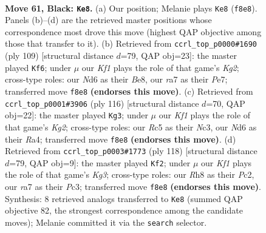 \documentclass[11pt]{article}
\begin{document}
\clearpage

\begin{figure}[p]\centering
\begin{subfigure}{0.46\textwidth}\centering
\resizebox{\linewidth}{!}{%
\newchessgame
\chessboard[
  setfen={5k1r/R6p/P2n4/2r5/2B5/1Pp3KP/R1P3P1/8 b - - 0 61},
  showmover=false,
  pgfstyle=straightmove, color=movearrow, markmove={f8-e8}
]}
\caption{}
\end{subfigure}\hfill
\begin{subfigure}{0.46\textwidth}\centering
\resizebox{\linewidth}{!}{%
\newchessgame
\chessboard[
  setfen={4b3/4p1k1/4P1p1/p1rB4/3R4/1P5P/6PK/8 b - - 4 55},
  showmover=false,
  pgfstyle=straightmove, color=movearrow, markmove={g7-f6}
]}
\caption{}
\end{subfigure}
\\[4pt]
\begin{subfigure}{0.46\textwidth}\centering
\resizebox{\linewidth}{!}{%
\newchessgame
\chessboard[
  setfen={8/4r2p/2p3p1/2kb4/R3p1PP/2N1P3/5PK1/8 w - - 21 59},
  showmover=false,
  pgfstyle=straightmove, color=movearrow, markmove={g2-g3}
]}
\caption{}
\end{subfigure}\hfill
\begin{subfigure}{0.46\textwidth}\centering
\resizebox{\linewidth}{!}{%
\newchessgame
\chessboard[
  setfen={8/p4k2/1p2pr1p/3b4/P1p3P1/2P2pK1/2P4R/3R4 w - - 10 60},
  showmover=false,
  pgfstyle=straightmove, color=movearrow, markmove={g3-f2}
]}
\caption{}
\end{subfigure}
\caption{\textbf{Move 61, Black: \texttt{Ke8}.} (a) Our position; Melanie plays \texttt{Ke8} (\texttt{f8e8}). Panels (b)--(d) are the retrieved master positions whose correspondence most drove this move (highest QAP objective among those that transfer to it). (b) Retrieved from \texttt{ccrl\_top\_p0000\#1690} (ply 109) [structural distance $d$=79, QAP obj=23]: the master played \texttt{Kf6}; under $\mu$ our \emph{Kf1} plays the role of that game's \emph{Kg2}; cross-type roles: our \emph{N}d6 as their \emph{B}e8, our \emph{r}a7 as their \emph{P}e7; transferred move \texttt{f8e8} \textbf{(endorses this move)}. (c) Retrieved from \texttt{ccrl\_top\_p0001\#3906} (ply 116) [structural distance $d$=70, QAP obj=22]: the master played \texttt{Kg3}; under $\mu$ our \emph{Kf1} plays the role of that game's \emph{Kg2}; cross-type roles: our \emph{R}c5 as their \emph{N}c3, our \emph{N}d6 as their \emph{R}a4; transferred move \texttt{f8e8} \textbf{(endorses this move)}. (d) Retrieved from \texttt{ccrl\_top\_p0003\#1773} (ply 118) [structural distance $d$=79, QAP obj=9]: the master played \texttt{Kf2}; under $\mu$ our \emph{Kf1} plays the role of that game's \emph{Kg3}; cross-type roles: our \emph{R}h8 as their \emph{P}c2, our \emph{r}a7 as their \emph{P}c3; transferred move \texttt{f8e8} \textbf{(endorses this move)}. Synthesis: 8 retrieved analogs transferred to \texttt{Ke8} (summed QAP objective 82, the strongest correspondence among the candidate moves); Melanie committed it via the \texttt{search} selector.}
\label{fig:thought-m121}
\end{figure}
\end{document}
